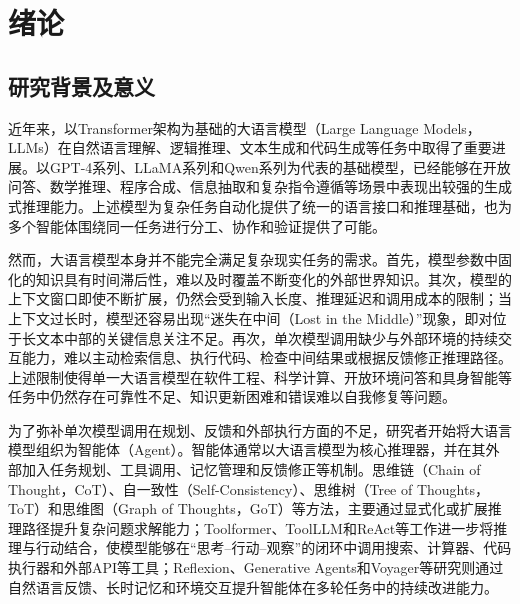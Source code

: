 
\chapter{绪论}
\label{chap:intro}

\section{研究背景及意义}

近年来，以Transformer架构为基础的大语言模型（Large Language Models，LLMs）\cite{vaswani2017attention}在自然语言理解、逻辑推理、文本生成和代码生成等任务中取得了重要进展。以GPT-4系列\cite{ref2}、LLaMA系列\cite{ref3,ref4,ref5}和Qwen系列\cite{ref6,ref7,ref8}为代表的基础模型，已经能够在开放问答、数学推理、程序合成、信息抽取和复杂指令遵循等场景中表现出较强的生成式推理能力。上述模型为复杂任务自动化提供了统一的语言接口和推理基础，也为多个智能体围绕同一任务进行分工、协作和验证提供了可能。

然而，大语言模型本身并不能完全满足复杂现实任务的需求。首先，模型参数中固化的知识具有时间滞后性，难以及时覆盖不断变化的外部世界知识\cite{ref28}。其次，模型的上下文窗口即使不断扩展，仍然会受到输入长度、推理延迟和调用成本的限制；当上下文过长时，模型还容易出现“迷失在中间（Lost in the Middle）”现象，即对位于长文本中部的关键信息关注不足\cite{ref29,ref30}。再次，单次模型调用缺少与外部环境的持续交互能力，难以主动检索信息、执行代码、检查中间结果或根据反馈修正推理路径。上述限制使得单一大语言模型在软件工程、科学计算、开放环境问答和具身智能等任务中仍然存在可靠性不足、知识更新困难和错误难以自我修复等问题\cite{ref9,ref10,ref11}。

为了弥补单次模型调用在规划、反馈和外部执行方面的不足，研究者开始将大语言模型组织为智能体（Agent）\cite{ref12}。智能体通常以大语言模型为核心推理器，并在其外部加入任务规划、工具调用、记忆管理和反馈修正等机制。思维链（Chain of Thought，CoT）\cite{ref13}、自一致性（Self-Consistency）\cite{ref14}、思维树（Tree of Thoughts，ToT）\cite{ref15}和思维图（Graph of Thoughts，GoT）\cite{ref16}等方法，主要通过显式化或扩展推理路径提升复杂问题求解能力；Toolformer\cite{ref17}、ToolLLM\cite{ref18}和ReAct\cite{ref23}等工作进一步将推理与行动结合，使模型能够在“思考--行动--观察”的闭环中调用搜索、计算器、代码执行器和外部API等工具；Reflexion\cite{ref25}、Generative Agents\cite{ref26}和Voyager\cite{ref27}等研究则通过自然语言反馈、长时记忆和环境交互提升智能体在多轮任务中的持续改进能力。

